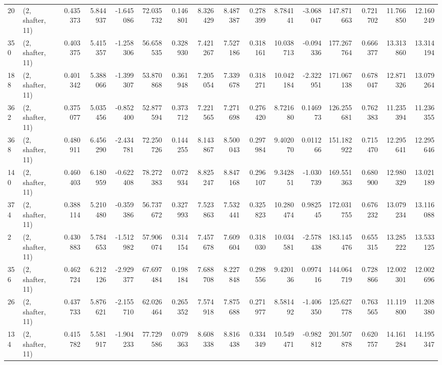 \begin{tabular}{llrrrrrrrrrrrrrr}
20  &  (2, shafter, 11) &   0.435373 &   5.844937 &  -1.645086 &    72.035732 &   0.146801 &   8.326429 &   8.487387 &  0.278399 &   8.784141 &  -3.068047 &    147.871663 &    0.721702 &   11.766850 &   12.160249 \\
350 &  (2, shafter, 11) &   0.403375 &   5.415357 &  -1.258306 &    56.658535 &   0.328930 &   7.421267 &   7.527186 &  0.318161 &  10.038713 &  -0.094336 &    177.267764 &    0.666377 &   13.313860 &   13.314194 \\
188 &  (2, shafter, 11) &   0.401342 &   5.388066 &  -1.399307 &    53.870868 &   0.361948 &   7.205054 &   7.339678 &  0.318271 &  10.042184 &  -2.322951 &    171.067138 &    0.678047 &   12.871326 &   13.079264 \\
362 &  (2, shafter, 11) &   0.375077 &   5.035456 &  -0.852400 &    52.877594 &   0.373712 &   7.221565 &   7.271698 &  0.276420 &   8.721680 &   0.146973 &    126.255681 &    0.762383 &   11.235394 &   11.236355 \\
368 &  (2, shafter, 11) &   0.480911 &   6.456290 &  -2.434781 &    72.250726 &   0.144255 &   8.143867 &   8.500043 &  0.297984 &   9.402070 &   0.011266 &    151.182922 &    0.715470 &   12.295641 &   12.295646 \\
140 &  (2, shafter, 11) &   0.460403 &   6.180959 &  -0.622408 &    78.272383 &   0.072934 &   8.825247 &   8.847168 &  0.296107 &   9.342851 &  -1.030739 &    169.551363 &    0.680900 &   12.980329 &   13.021189 \\
374 &  (2, shafter, 11) &   0.388114 &   5.210480 &  -0.359386 &    56.737672 &   0.327993 &   7.523863 &   7.532441 &  0.325823 &  10.280474 &   0.982545 &    172.031755 &    0.676232 &   13.079234 &   13.116088 \\
2   &  (2, shafter, 11) &   0.430883 &   5.784653 &  -1.512982 &    57.906074 &   0.314154 &   7.457678 &   7.609604 &  0.318030 &  10.034581 &  -2.578438 &    183.145476 &    0.655315 &   13.285222 &   13.533125 \\
356 &  (2, shafter, 11) &   0.462724 &   6.212126 &  -2.929377 &    67.697484 &   0.198184 &   7.688708 &   8.227848 &  0.298556 &   9.420136 &   0.097416 &    144.064719 &    0.728866 &   12.002301 &   12.002696 \\
26  &  (2, shafter, 11) &   0.437733 &   5.876621 &  -2.155710 &    62.026464 &   0.265352 &   7.574918 &   7.875688 &  0.271977 &   8.581492 &  -1.406350 &    125.627778 &    0.763565 &   11.119800 &   11.208380 \\
134 &  (2, shafter, 11) &   0.415782 &   5.581917 &  -1.904233 &    77.729586 &   0.079363 &   8.608338 &   8.816438 &  0.334349 &  10.549471 &  -0.982812 &    201.507878 &    0.620757 &   14.161284 &   14.195347 \\

\end{tabular}
